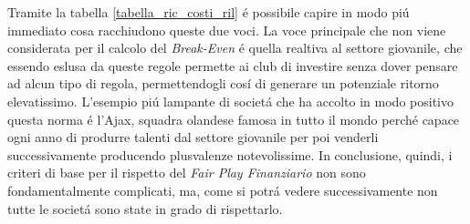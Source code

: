 \documentclass[
    corpo=12pt,
    oneside,
    evenboxes,
    tipotesi=triennale,
    stile=classica,
    oldstyle,
    autoretitolo,
    greek,
]{toptesi}
\begin{document}
\begin{interlinea}{1.5}
\begin{table}
    \label{tabella_ric_costi_ril}
\end{table} 
Tramite la tabella \ref{tabella_ric_costi_ril} \'e possibile capire in modo pi\'u immediato cosa racchiudono queste due voci. La voce principale 
che non viene considerata per il calcolo del \emph{Break-Even} \'e quella realtiva al settore giovanile, che essendo eslusa da queste regole
permette ai club di investire senza dover pensare ad alcun tipo di regola, permettendogli cos\'i di generare un potenziale ritorno
elevatissimo. L'esempio pi\'u lampante di societ\'a che ha accolto in modo positivo questa norma \'e l'Ajax, squadra olandese famosa in 
tutto il mondo perch\'e capace ogni anno di produrre talenti dal settore giovanile per poi venderli successivamente
producendo plusvalenze \linebreak notevolissime.\newline
In conclusione, quindi, i criteri di base per il rispetto del \emph{Fair Play Finanziario} non sono fondamentalmente complicati, ma, come 
si potr\'a vedere successivamente non tutte le societ\'a sono state in grado di rispettarlo.

\end{interlinea}
\end{document}
